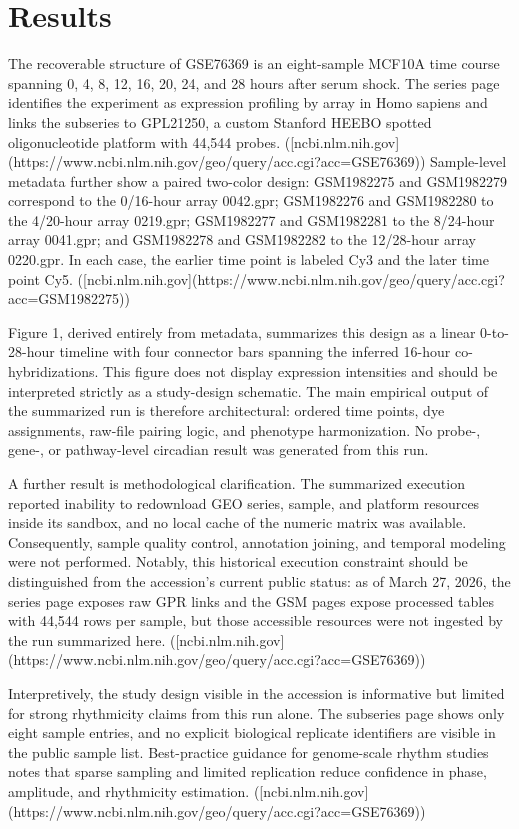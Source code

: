 \documentclass[11pt]{article}
\begin{document}
\section{Results}
The recoverable structure of GSE76369 is an eight-sample MCF10A time course spanning 0, 4, 8, 12, 16, 20, 24, and 28 hours after serum shock. The series page identifies the experiment as expression profiling by array in Homo sapiens and links the subseries to GPL21250, a custom Stanford HEEBO spotted oligonucleotide platform with 44,544 probes. ([ncbi.nlm.nih.gov](https://www.ncbi.nlm.nih.gov/geo/query/acc.cgi?acc=GSE76369)) Sample-level metadata further show a paired two-color design: GSM1982275 and GSM1982279 correspond to the 0/16-hour array 0042.gpr; GSM1982276 and GSM1982280 to the 4/20-hour array 0219.gpr; GSM1982277 and GSM1982281 to the 8/24-hour array 0041.gpr; and GSM1982278 and GSM1982282 to the 12/28-hour array 0220.gpr. In each case, the earlier time point is labeled Cy3 and the later time point Cy5. ([ncbi.nlm.nih.gov](https://www.ncbi.nlm.nih.gov/geo/query/acc.cgi?acc=GSM1982275))

Figure 1, derived entirely from metadata, summarizes this design as a linear 0-to-28-hour timeline with four connector bars spanning the inferred 16-hour co-hybridizations. This figure does not display expression intensities and should be interpreted strictly as a study-design schematic. The main empirical output of the summarized run is therefore architectural: ordered time points, dye assignments, raw-file pairing logic, and phenotype harmonization. No probe-, gene-, or pathway-level circadian result was generated from this run.

A further result is methodological clarification. The summarized execution reported inability to redownload GEO series, sample, and platform resources inside its sandbox, and no local cache of the numeric matrix was available. Consequently, sample quality control, annotation joining, and temporal modeling were not performed. Notably, this historical execution constraint should be distinguished from the accession's current public status: as of March 27, 2026, the series page exposes raw GPR links and the GSM pages expose processed tables with 44,544 rows per sample, but those accessible resources were not ingested by the run summarized here. ([ncbi.nlm.nih.gov](https://www.ncbi.nlm.nih.gov/geo/query/acc.cgi?acc=GSE76369))

Interpretively, the study design visible in the accession is informative but limited for strong rhythmicity claims from this run alone. The subseries page shows only eight sample entries, and no explicit biological replicate identifiers are visible in the public sample list. Best-practice guidance for genome-scale rhythm studies notes that sparse sampling and limited replication reduce confidence in phase, amplitude, and rhythmicity estimation. ([ncbi.nlm.nih.gov](https://www.ncbi.nlm.nih.gov/geo/query/acc.cgi?acc=GSE76369))
\end{document}
